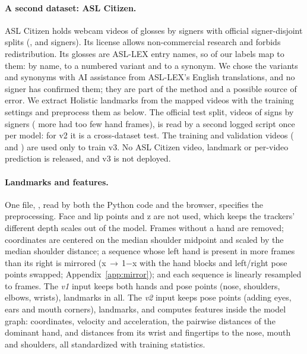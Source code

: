 \paragraph{A second dataset: ASL Citizen.}
ASL Citizen \citep{desai2023aslcitizen} holds  webcam videos of
 glosses by  signers with official signer-disjoint splits
(,  and  signers). Its
license allows non-commercial research and forbids redistribution. Its glosses are ASL-LEX entry
names, so  of our  labels map to them:  by
name,  to a numbered variant and  to a synonym. We chose the
variants and synonyms with AI assistance from ASL-LEX's English translations, and no signer has
confirmed them; they are part of the method and a possible source of error. We extract
Holistic landmarks from the mapped videos with the training settings and preprocess them as
below. The official test split,  videos of  signs by 
signers ( more had too few hand frames), is read by a second logged script once
per model: for v2 it is a cross-dataset test. The training and validation videos
( and ) are used only to train v3. No ASL Citizen video, landmark or
per-video prediction is released, and v3 is not deployed.

\paragraph{Landmarks and features.}
One file, , read by both the Python code and the browser, specifies the
preprocessing. Face and lip points and z are not used, which keeps the trackers' different depth
scales out of the model. Frames without a hand are removed;
coordinates are centered on the median shoulder midpoint and scaled by the median shoulder
distance; a sequence whose left hand is present in more frames than its right is mirrored
(x\,$\to$\,1$-$x with the hand blocks and left/right pose points swapped; Appendix~\ref{app:mirror});
and each sequence is linearly resampled to  frames. The \emph{v1} input keeps both
hands and  pose points (nose, shoulders, elbows, wrists), 
landmarks in all. The \emph{v2} input keeps  pose points (adding eyes, ears and
mouth corners),  landmarks, and computes  features inside the model
graph: coordinates, velocity and acceleration, the  pairwise distances of the
dominant hand, and  distances from its wrist and fingertips to the nose, mouth and
shoulders, all standardized with training statistics.
